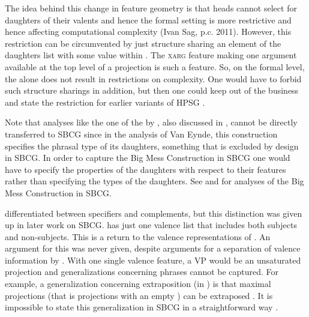 \documentclass[output=paper
	        ,collection
	        ,collectionchapter
 	        ,biblatex
                ,babelshorthands
                ,newtxmath
                ,draftmode
                ,colorlinks, citecolor=brown
]{langscibook}
\begin{document}
\z
The idea behind this change in feature geometry is that heads cannot select for daughters of their valents and hence
the formal setting is more restrictive and hence affecting computational complexity (Ivan Sag,
p.c. 2011). However, this restriction can be circumvented by just structure sharing an element of
the daughters list with some value within \mother. The \textsc{xarg} feature making one argument
available at the top level of a projection \citep{BF99a} is such a feature. So, on the formal level, the \motherf alone does not
result in restrictions on complexity. One would have to forbid such structure sharings in addition,
but then one could keep \mother out of the business and state the restriction for earlier variants
of HPSG \citep[Section~10.6.2.1.3]{MuellerGT-Eng2}.

Note that analyses like the one of the  by \citet[]{VanEynde2018a-u}, also discussed in
\crossrefchapterw[\page \pageref{bigmess2}]{np}, cannot be directly transferred to SBCG since in the
analysis of Van Eynde, this construction specifies the phrasal type of its daughters, something that
is excluded by design in SBCG. In order to capture the Big Mess Construction in SBCG one would have
to specify the properties of the daughters with respect to their features rather than specifying the
types of the daughters. See \citet{KS2012a-u} and \citet{KS2011a-u} for analyses of the Big Mess Construction in SBCG.


\citet{SWB2003a} differentiated between specifiers and complements, but this distinction was given up
in later work on SBCG. \citet{Sag2012a} has just one valence list that includes both subjects and
non-subjects. This is a return to the valence representations of \citet{ps}. An argument for this
was never given, despite arguments for a separation of valence information by \citet{Borsley87a}. With one single valence feature, a VP would be an unsaturated projection and generalizations
concerning phrases cannot be captured. For example, a generalization concerning extraposition (in
) is that maximal projections (that is projections with an empty \compsl) can be
extraposed \citep[Section~13.1.2]{Mueller99a}. It is impossible to state this generalization in SBCG
in a straightforward way \citep[Section~10.6.2.3]{MuellerGT-Eng2}.

\end{document}
